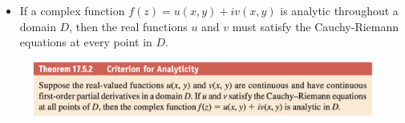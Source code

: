 \documentclass{article}
\begin{document}
\begin{itemize}
  \item If a complex function $f(z) = u(x, y) + i v(x, y)$ is analytic throughout a domain $D$, then the real functions $u$ and $v$ must satisfy the Cauchy-Riemann equations at every point in $D$.
\end{itemize}

\begin{figure}[H]
  \centering
  \includegraphics[width=\textwidth]{criterion-for-analyticity}
\end{figure}
\end{document}
